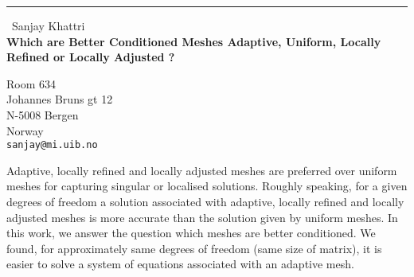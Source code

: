 \documentclass{report}
\begin{document}
\begin{center}
\rule{6in}{1pt} \
{\large Sanjay Khattri \\
{\bf Which are Better Conditioned Meshes Adaptive, Uniform, Locally Refined or Locally Adjusted ?}}

Room 634 \\ Johannes Bruns gt 12 \\ N-5008 Bergen \\ Norway
\\
{\tt sanjay@mi.uib.no}\end{center}

Adaptive, locally refined and locally adjusted meshes are preferred over
uniform meshes for capturing singular or localised solutions. Roughly
speaking, for a given degrees of freedom a solution associated with
adaptive, locally refined and locally adjusted meshes is more accurate
than the solution given by uniform meshes. In this work, we answer the
question which meshes are better conditioned.
We found, for approximately same degrees of freedom (same size of
matrix), it is easier to solve a system of equations associated with an
adaptive mesh.
\end{document}
